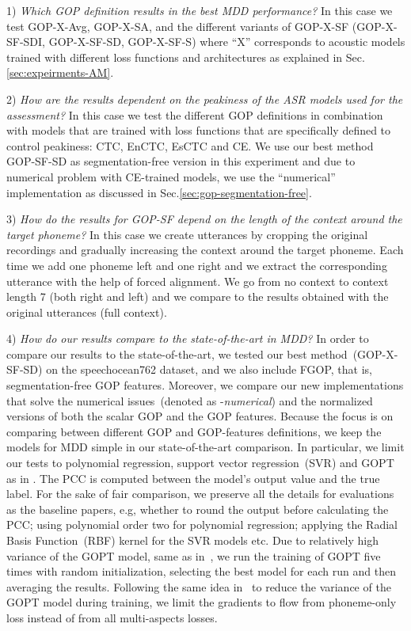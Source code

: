 1) \emph{Which GOP definition results in the best MDD performance?}
In this case we test GOP-X-Avg, GOP-X-SA, and the different variants of GOP-X-SF (GOP-X-SF-SDI, GOP-X-SF-SD, GOP-X-SF-S) where ``X'' corresponds to acoustic models trained with different loss functions and architectures as explained in Sec.\ref{sec:expeirments-AM}.



2) \emph{How are the results dependent on the peakiness of the ASR models used for the assessment?}
In this case we test the different GOP definitions in combination with models that are trained with loss functions that are specifically defined to control peakiness: CTC, EnCTC, EsCTC and CE.
We use our best method GOP-SF-SD as segmentation-free version in this experiment and due to numerical problem with CE-trained models, we use the ``numerical'' implementation as discussed in Sec.\ref{sec:gop-segmentation-free}.

3) \emph{How do the results for GOP-SF depend on the length of the context around the target phoneme?}
In this case we create utterances by cropping the original recordings and gradually increasing the context around the target phoneme.
Each time we add one phoneme left and one right and we extract the corresponding utterance with the help of forced alignment.
We go from no context to context length 7 (both right and left) and we compare to the results obtained with the original utterances (full context).

4) \emph{How do our results compare to the state-of-the-art in MDD?}
In order to compare our results to the state-of-the-art, we tested our best method~(GOP-X-SF-SD) on the speechocean762 dataset, and we also include FGOP, that is, segmentation-free GOP features.
Moreover, we compare our new implementations that solve the numerical issues~(denoted as -\textit{numerical}) and the normalized versions of both the scalar GOP and the GOP features. 
Because the focus is on comparing between different GOP and GOP-features definitions, we keep the models for MDD simple in our state-of-the-art comparison.
In particular, we limit our tests to polynomial regression, support vector regression~(SVR) and GOPT as in \cite{GOPT}.
The PCC is computed between the model's output value and the true label.
For the sake of fair comparison, we preserve all the details for evaluations as the baseline papers, e.g, whether to round the output before calculating the PCC; using polynomial order two for polynomial regression; applying the Radial Basis Function~(RBF) kernel for the SVR models etc.
Due to relatively high variance of the GOPT model, same as in~\cite{GOPT}, we run the training of GOPT five times with random initialization, selecting the best model for each run and then averaging the results.
Following the same idea in~\cite{cao23_interspeech} to reduce the variance of the GOPT model during training, we limit the gradients to flow from phoneme-only loss instead of from all multi-aspects losses.

